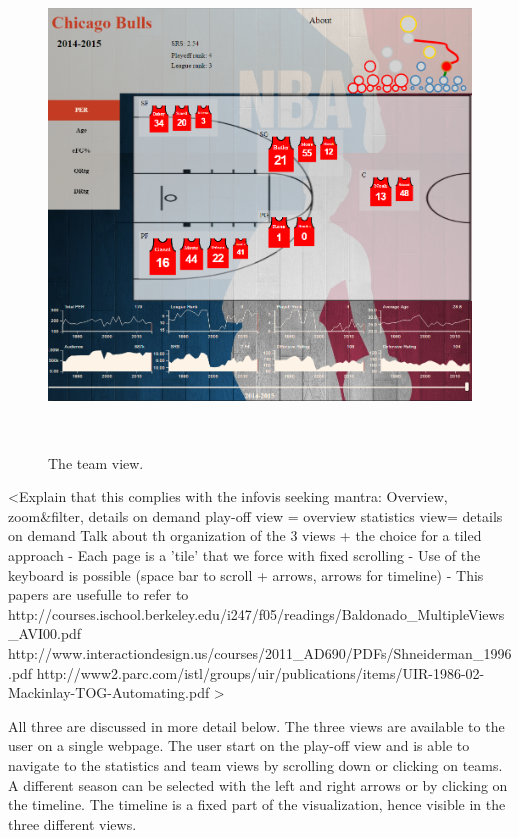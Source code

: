 \documentclass{sigchi}
\begin{document}
\begin{figure}
\centering
  \includegraphics[width=0.9\columnwidth]{figures/teamview}
  \caption{The team view.}~\label{fig:teamview}
\end{figure}

<Explain that this complies with the infovis seeking mantra: Overview, zoom\&filter, details on demand
play-off view = overview
statistics view= details on demand
Talk about th organization of the 3 views + the choice for a tiled approach
- Each page is a 'tile' that we force with fixed scrolling
- Use of the keyboard is possible (space bar to scroll + arrows, arrows for timeline)
- This papers are usefulle to refer to
http://courses.ischool.berkeley.edu/i247/f05/readings/Baldonado\_MultipleViews\_AVI00.pdf
http://www.interactiondesign.us/courses/2011\_AD690/PDFs/Shneiderman\_1996.pdf
http://www2.parc.com/istl/groups/uir/publications/items/UIR-1986-02-Mackinlay-TOG-Automating.pdf
>

All three are discussed in more detail below. The three views are available to
the user on a single webpage. The user start on the play-off view and is able to
navigate to the statistics and team views by scrolling down or clicking on
teams. A different season can be selected with the left and right arrows or by clicking on the timeline. The timeline is a fixed part of the visualization, hence visible in the three different views.
\end{document}

